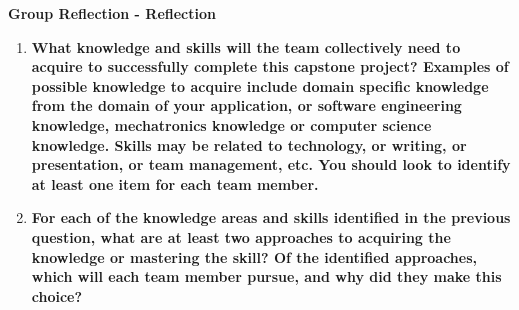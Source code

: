 \textbf{Group Reflection  - Reflection}
\begin{enumerate}
    \item \textbf{What knowledge and skills will the team collectively need to acquire to
  successfully complete this capstone project?  Examples of possible knowledge
  to acquire include domain specific knowledge from the domain of your
  application, or software engineering knowledge, mechatronics knowledge or
  computer science knowledge.  Skills may be related to technology, or writing,
  or presentation, or team management, etc.  You should look to identify at
  least one item for each team member.}\newline
  
  \item \textbf{For each of the knowledge areas and skills identified in the previous
  question, what are at least two approaches to acquiring the knowledge or
  mastering the skill?  Of the identified approaches, which will each team
  member pursue, and why did they make this choice?}\newline

\end{enumerate}


